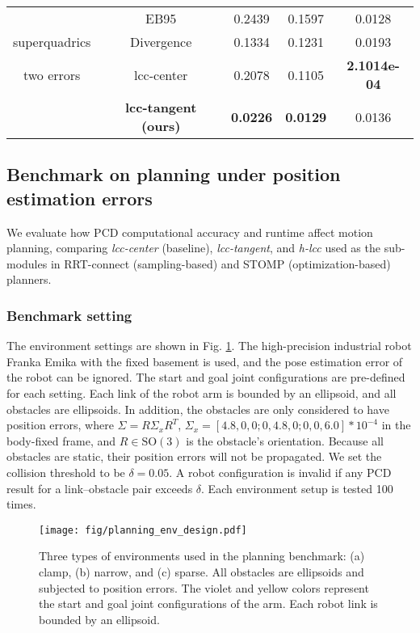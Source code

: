 \documentclass[conference]{IEEEtran}
\newcommand{\SO}{\text{SO}}
\begin{document}
\begin{table}[tb]
{\begin{tabular}{ccccc}
\multicolumn{1}{c|}{}              & EB95                 & 0.2439          & 0.1597          & 0.0128              \\
\multicolumn{1}{c|}{superquadrics} & Divergence           & 0.1334         & 0.1231        & 0.0193              \\
\multicolumn{1}{c|}{two errors}    & lcc-center           & 0.2078          & 0.1105          & \textbf{2.1014e-04} \\
\multicolumn{1}{c|}{}              & \textbf{lcc-tangent (ours)} & \textbf{0.0226} & \textbf{0.0129} & 0.0136              \\ \hline
\end{tabular}%
}
\end{table}

\subsection{Benchmark on planning under position estimation errors}
We evaluate how PCD computational accuracy and runtime affect motion planning, comparing \textit{lcc-center} (baseline), \textit{lcc-tangent}, and \textit{h-lcc} used as the sub-modules in RRT-connect (sampling-based) \cite{sucan2012the-open-motion-planning-library} and STOMP (optimization-based) \cite{kalakrishnan2011stomp} planners.

\subsubsection{Benchmark setting} The environment settings are shown in Fig. \ref{fig:results:env-setting}. The high-precision industrial robot Franka Emika with the fixed basement is used, and the pose estimation error of the robot can be ignored. The start and goal joint configurations are pre-defined for each setting. Each link of the robot arm is bounded by an ellipsoid, and all obstacles are ellipsoids. In addition, the obstacles are only considered to have position errors, where $\Sigma=R\Sigma_x R^T$, $\Sigma_x=[4.8,0,0;0,4.8,0;0,0,6.0]*10^{-4}$ in the body-fixed frame, and $R\in \SO(3)$ is the obstacle's orientation. Because all obstacles are static, their position errors will not be propagated. We set the collision threshold to be $\delta=0.05$. A robot configuration is invalid if any PCD result for a link–obstacle pair exceeds $\delta$. Each environment setup is tested 100 times.

\begin{figure}[tb]
\centering
\texttt{[image: fig/planning\_env\_design.pdf]}
\caption{Three types of environments used in the planning benchmark: (a) clamp, (b) narrow, and (c) sparse. All obstacles are ellipsoids and subjected to position errors. The violet and yellow colors represent the start and goal joint configurations of the arm. Each robot link is bounded by an ellipsoid.}
\label{fig:results:env-setting}
\end{figure}
\end{document}
